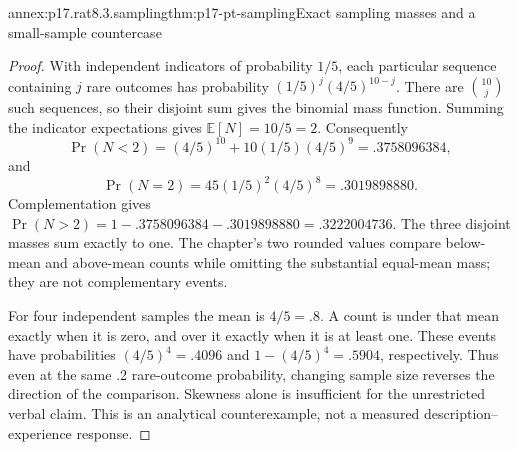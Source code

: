 \begin{annexitem}{annex:p17.rat8.3.sampling}{thm:p17-pt-sampling}{Exact sampling masses and a small-sample countercase}
\begin{proof}
With independent indicators of probability \(1/5\), each
particular sequence containing \(j\) rare outcomes has
probability \((1/5)^j(4/5)^{10-j}\). There are
\(\binom{10}{j}\) such sequences, so their disjoint
sum gives the binomial mass function. Summing the
indicator expectations gives \(\mathbb E[N]=10/5=2\).
Consequently
\[
 \Pr(N<2)=(4/5)^{10}+10(1/5)(4/5)^9
                =.3758096384,
\]
and
\[
 \Pr(N=2)=45(1/5)^2(4/5)^8=.3019898880.
\]
Complementation gives
\(\Pr(N>2)=1-.3758096384-.3019898880=.3222004736\).
The three disjoint masses sum exactly to one. The
chapter's two rounded values compare below-mean and
above-mean counts while omitting the substantial
equal-mean mass; they are not complementary events.

For four independent samples the mean is \(4/5=.8\).
A count is under that mean exactly when it is zero,
and over it exactly when it is at least one. These
events have probabilities \((4/5)^4=.4096\) and
\(1-(4/5)^4=.5904\), respectively. Thus even at
the same .2 rare-outcome probability, changing sample
size reverses the direction of the comparison. Skewness
alone is insufficient for the unrestricted verbal claim.
This is an analytical counterexample, not a measured
description--experience response.
\end{proof}
\end{annexitem}
